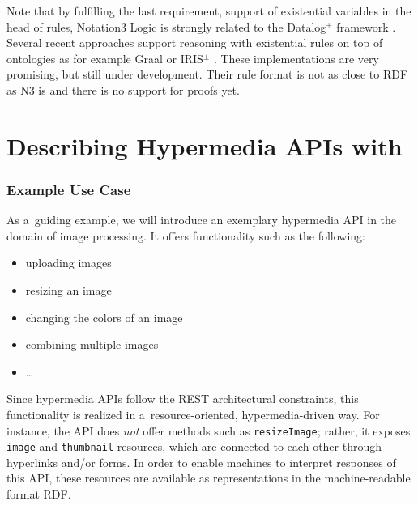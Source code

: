 
Note that by fulfilling the last requirement, support of existential variables in the head of rules, Notation3 Logic is strongly 
related to 
the Datalog$^{\pm}$ framework \cite{datalogpm,exrules}.
Several recent approaches support reasoning with existential rules on top of  ontologies as for example 
Graal \cite{graal} or IRIS$^\pm$ \cite{irispm}. These implementations are very promising, but still under development. Their rule format is
not as close to RDF as N3 is
and there is no support for proofs yet.




















\section{Describing Hypermedia APIs with \restdesc}
\label{sec:RESTdesc}
\subsubsection{Example Use Case}\label{usecase}
As a~guiding example, we will introduce an exemplary hypermedia API
in the domain of image processing.
It offers functionality such as the following:
\begin{itemize}
  \item uploading images
  \item resizing an image
  \item changing the colors of an image
  \item combining multiple images
  \item \ldots
\end{itemize}
Since hypermedia APIs follow the REST architectural constraints,
this functionality is realized in a~resource-oriented, hypermedia-driven way.
For instance, the API does \emph{not} offer methods such as \verb!resizeImage!;
rather, it exposes \verb!image! and \verb!thumbnail! resources,
which are connected to each other through hyperlinks and/or forms.
In order to enable machines to interpret responses of this API,
these resources are available as representations in the machine-readable format RDF.

